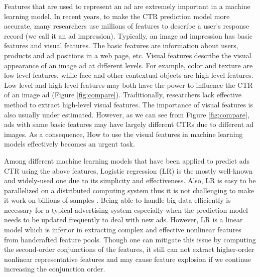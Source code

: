 \documentclass{sig-alternate}
\begin{document}
Features that are used to represent an ad are extremely important in a machine learning model. In recent years, to make the CTR prediction model more accurate, many researchers use millions of features to describe a user's response record (we call it an ad impression). Typically, an image ad impression has basic features and visual features. The basic features are information about users, products and ad positions in a web page, etc. Visual features describe the visual appearance of an image ad at different levels. For example, color and  texture are low level features, while face and other contextual objects are high level features. Low level and high level features may both have the power to influence the CTR of an image ad (Figure \ref{fig:compare}). Traditionally,  researchers lack effective  method to extract  high-level visual features. The importance of visual features is also usually under estimated. However, as we can see from Figure \ref{fig:compare}, ads with same basic features may have largely different CTRs due to different ad images. As a consequence, How to use the visual features in machine learning models effectively becomes an urgent task.

Among different machine learning models that have been applied to predict ads CTR using the above features, Logistic regression (LR) is the mostly well-known and widely-used one due to its simplicity and effectiveness. Also, LR is easy to be parallelized on a distributed computing system thus it is not challenging to make it work on billions of samples \cite{chapelle2014simple}. Being able to handle big data efficiently is necessary for a typical advertising system especially when the prediction model needs to be updated frequently to deal with new ads. However, LR is a linear model which is inferior in extracting complex and effective nonlinear features from handcrafted feature pools. Though one can mitigate this issue by computing the second-order conjunctions of the features, it still can not extract higher-order nonlinear representative features and may cause feature explosion if we continue increasing the conjunction order. %
\end{document}
